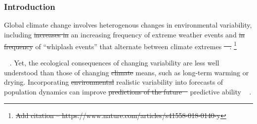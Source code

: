 \documentclass[lineno, sn-basic]{sn-jnl}%
\providecommand{\DIFadd}[1]{{\protect\color{blue}#1}} %
\providecommand{\DIFdel}[1]{{\protect\color{red}\protect\scriptsize\sout{#1}}}
\providecommand{\DIFadd}[1]{{\protect\color{blue}\uwave{#1}}} %
\providecommand{\DIFdel}[1]{{\protect\color{red}\sout{#1}}}                      %
\providecommand{\DIFaddbegin}{} %
\providecommand{\DIFaddend}{} %
\providecommand{\DIFdelbegin}{} %
\providecommand{\DIFdelend}{} %
\newcommand{\DIFscaledelfig}{0.5}
\newlength{\DIFdelgraphicswidth} %
\newlength{\DIFdelgraphicsheight} %
\newcommand{\DIFaddincludegraphics}[2][]{{\color{blue}\fbox{\DIFOincludegraphics[#1]{#2}}}} %
\newcommand{\DIFdelincludegraphics}[2][]{%
\sbox{\DIFdelgraphicsbox}{\DIFOincludegraphics[#1]{#2}}%
\settoboxwidth{\DIFdelgraphicswidth}{\DIFdelgraphicsbox} %
\settoboxtotalheight{\DIFdelgraphicsheight}{\DIFdelgraphicsbox} %
\scalebox{\DIFscaledelfig}{%
\parbox[b]{\DIFdelgraphicswidth}{\usebox{\DIFdelgraphicsbox}\\[-\baselineskip] \rule{\DIFdelgraphicswidth}{0em}}\llap{\resizebox{\DIFdelgraphicswidth}{\DIFdelgraphicsheight}{%
\setlength{\unitlength}{\DIFdelgraphicswidth}%
\begin{picture}(1,1)%
\thicklines\linethickness{2pt} %
{\color[rgb]{1,0,0}\put(0,0){\framebox(1,1){}}}%
{\color[rgb]{1,0,0}\put(0,0){\line( 1,1){1}}}%
{\color[rgb]{1,0,0}\put(0,1){\line(1,-1){1}}}%
\end{picture}%
}\hspace*{3pt}}} %
} %
\DeclareRobustCommand{\DIFaddbegin}{\DIFOaddbegin \let\includegraphics\DIFaddincludegraphics} %
\DeclareRobustCommand{\DIFaddend}{\DIFOaddend \let\includegraphics\DIFOincludegraphics} %
\DeclareRobustCommand{\DIFdelbegin}{\DIFOdelbegin \let\includegraphics\DIFdelincludegraphics} %
\DeclareRobustCommand{\DIFdelend}{\DIFOaddend \let\includegraphics\DIFOincludegraphics} %
\begin{document}


		\maketitle




\DIFaddbegin \part{} %

\DIFaddend \section*{Introduction}
Global climate change involves heterogenous changes in environmental variability, including \DIFdelbegin \DIFdel{increases in }\DIFdelend \DIFaddbegin \DIFadd{an increasing }\DIFaddend frequency of extreme weather events and \DIFdelbegin \DIFdel{in frequency }\DIFdelend of ``whiplash events'' that alternate between climate extremes \DIFdelbegin \DIFdel{\mbox{%
\cite{seneviratne2012changes, bathiany2018climate, ipcc_2021}}\hspace{0pt}%
.
}\footnote{\DIFdel{Add citation -- https://www.nature.com/articles/s41558-018-0140-y}}
\addtocounter{footnote}{-1}%
\DIFdelend \DIFaddbegin \DIFadd{\mbox{%
\citep{seneviratne2012changes, bathiany2018climate,swain2018increasing,ipcc_2021}}\hspace{0pt}%
.
}\DIFaddend Yet, the ecological consequences of changing variability are less well understood than those of changing \DIFdelbegin \DIFdel{climate }\DIFdelend means, such as long-term warming or drying. 
Incorporating \DIFdelbegin \DIFdel{environmental }\DIFdelend \DIFaddbegin \DIFadd{realistic }\DIFaddend variability into forecasts of population dynamics can improve \DIFdelbegin \DIFdel{predictions of the future \mbox{%
\cite{clark2005environmental}}\hspace{0pt}%
}\DIFdelend \DIFaddbegin \DIFadd{predictive ability \mbox{%
\citep{clark2005environmental}}\hspace{0pt}%
}\DIFaddend .
\end{document}
